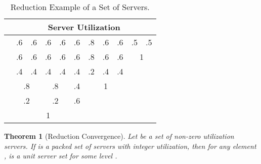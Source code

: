 \documentclass[twocolumn, compsocconf]{IEEEtran}
\newtheorem{theorem}{Theorem}[section]
\begin{document}
\setlength{\tabcolsep}{0.5em}
\begin{table}
  \centering
\caption{Reduction Example of a Set of Servers.\label{tab:reducExample}}
  \begin{tabular}{|l|c|c|c|c|c|c|c|c|c|c|}
    \hline  \rule{0cm}{.4cm}
    & \multicolumn{10}{c|}{Server Utilization \rule{0cm}{.4cm}} \\
    \hline 
     \rule{0cm}{.35cm} & .6 & .6 & .6 & .6 & .6 & .8 & .6 & .6 & .5 & .5 \\
    \hline 
     \rule{0cm}{.35cm} & .6 & .6 & .6 & .6 & .6 & .8 & .6 & .6 & 
    \multicolumn{2}{c|}{1} \\
    \hline  
     \rule{0cm}{.35cm} & .4 & .4 & .4 & .4 & .4 & .2 & .4 & .4 \\
    \cline{1-9}
     \rule{0cm}{.35cm} & \multicolumn{2}{c|}{.8} & 
    \multicolumn{2}{c|}{.8} & .4 & \multicolumn{3}{c|}{1} \\
    \cline{1-9}
     \rule{0cm}{.35cm} & \multicolumn{2}{c|}{.2} & 
    \multicolumn{2}{c|}{.2} & .6 \\
    \cline{1-6} 
     & \multicolumn{5}{c|}{ \rule{0cm}{.35cm} 1}\\
    \cline{1-6}
  \end{tabular}
\end{table}

\begin{theorem}[Reduction Convergence]\label{thm:reducConv}
  Let  be a set of non-zero utilization servers.  If  is a
  packed set of servers with integer utilization, then for any element ,  is a unit server set for some level .
\end{theorem}
\end{document}
